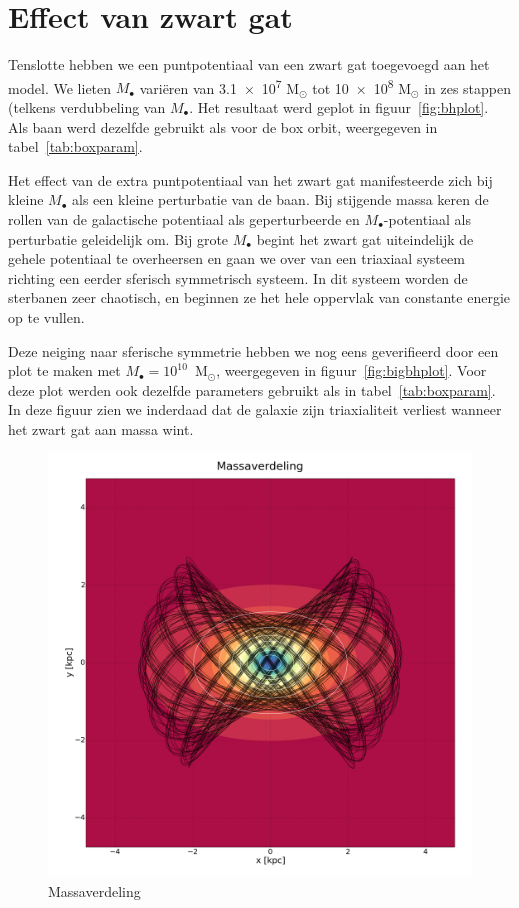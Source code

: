 \documentclass[11pt,a4paper,twoside,dutch]{article}
\begin{document}
\section{Effect van zwart gat}
Tenslotte hebben we een puntpotentiaal van een zwart gat toegevoegd aan het model. We lieten $M_\bullet$ vari\"eren van \num{3.1e7} M$_\odot$ tot \num{10e8} M$_\odot$ in zes stappen (telkens verdubbeling van $M_\bullet$. Het resultaat werd geplot in figuur~\ref{fig:bhplot}. Als baan werd dezelfde gebruikt als voor de box orbit, weergegeven in tabel~\ref{tab:boxparam}.

Het effect van de extra puntpotentiaal van het zwart gat manifesteerde zich bij kleine $M_\bullet$ als een kleine perturbatie van de baan. Bij stijgende massa keren de rollen van de galactische potentiaal als geperturbeerde en $M_\bullet$-potentiaal als perturbatie geleidelijk om. Bij grote $M_\bullet$ begint het zwart gat uiteindelijk de gehele potentiaal te overheersen en gaan we over van een triaxiaal systeem richting een eerder sferisch symmetrisch systeem. In dit systeem worden de sterbanen zeer chaotisch, en beginnen ze het hele oppervlak van constante energie op te vullen.

Deze neiging naar sferische symmetrie hebben we nog eens geverifieerd door een plot te maken met $M_\bullet = 10^{10}$~M$_{\odot}$, weergegeven in figuur~\ref{fig:bigbhplot}. Voor deze plot werden ook dezelfde parameters gebruikt als in tabel~\ref{tab:boxparam}. In deze figuur zien we inderdaad dat de galaxie zijn triaxialiteit verliest wanneer het zwart gat aan massa wint.

\newpage
\begin{figure}[b]
\centering
\includegraphics[width=1\textwidth]{img/mass.png}
\caption{Massaverdeling}
\label{fig:mass}
\end{figure}
\end{document}
